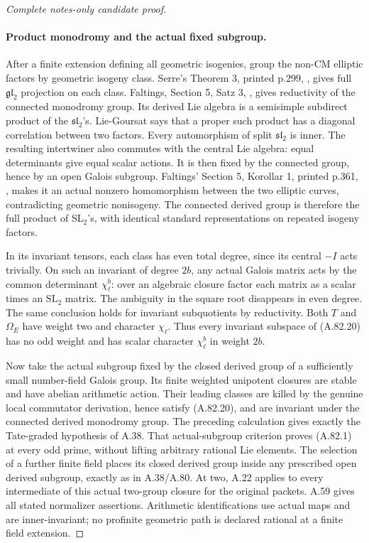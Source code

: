 \begin{proof}[Complete notes-only candidate proof]
\paragraph{Product monodromy and the actual fixed subgroup.}
After a finite extension defining all geometric isogenies, group
the non-CM elliptic factors by geometric isogeny class. Serre's
Theorem 3, printed p.299, \cite{A_Serre1972}, gives full
\(\mathfrak{gl}_2\) projection on each class.
Faltings, Section 5, Satz 3, \cite{DE_Faltings1983}, gives reductivity of the
connected monodromy group. Its derived Lie algebra is a semisimple
subdirect product of the \(\mathfrak{sl}_2\)'s. Lie-Goursat says
that a proper such product has a diagonal correlation between two
factors. Every automorphism of split \(\mathfrak{sl}_2\) is inner.
The resulting intertwiner also commutes with the central Lie
algebra: equal determinants give equal scalar actions. It is then
fixed by the connected group, hence by an open Galois subgroup.
Faltings' Section 5, Korollar 1, printed p.361, \cite{DE_Faltings1983},
makes it an actual
nonzero homomorphism between the two elliptic curves, contradicting
geometric nonisogeny. The connected derived group is therefore the
full product of \(\mathrm{SL}_2\)'s, with identical standard
representations on repeated isogeny factors.

In its invariant tensors, each class has even total degree, since
its central \(-I\) acts trivially. On such an invariant of degree
\(2b\), any actual Galois matrix acts by the common determinant
\(\chi_\ell^b\): over an algebraic closure factor each matrix
as a scalar times an \(\mathrm{SL}_2\) matrix. The ambiguity in
the square root disappears in even degree. The same conclusion
holds for invariant subquotients by reductivity. Both \(T\) and
\(\Omega_E\) have weight two and character \(\chi_\ell\).
Thus every invariant subspace of (A.82.20) has no odd weight and
has scalar character \(\chi_\ell^b\) in weight \(2b\).

Now take the actual subgroup fixed by the closed derived group
of a sufficiently small number-field Galois group. Its finite
weighted unipotent closures are stable and have abelian arithmetic
action. Their leading classes are killed by the genuine local
commutator derivation, hence satisfy (A.82.20), and are invariant
under the connected derived monodromy group. The preceding
calculation gives exactly the Tate-graded hypothesis of A.38.
That actual-subgroup criterion proves (A.82.1) at every odd prime,
without lifting arbitrary rational Lie elements. The selection of
a further finite field places its closed derived group inside any
prescribed open derived subgroup, exactly as in A.38/A.80.
At two, A.22 applies to every intermediate of this actual two-group
closure for the original packets. A.59 gives all stated normalizer
assertions. Arithmetic identifications use actual maps and are
inner-invariant; no profinite geometric path is declared rational
at a finite field extension.


\end{proof}
